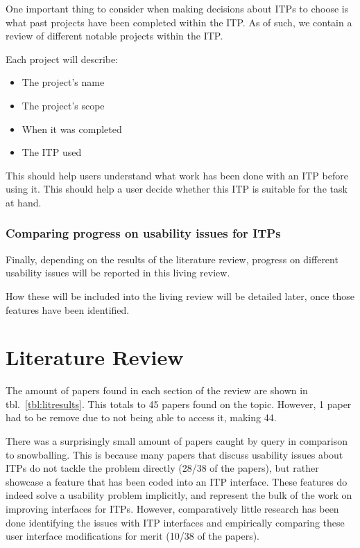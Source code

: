 \documentclass[
]{article}
\providecommand{\tightlist}{%
  \setlength{\itemsep}{0pt}\setlength{\parskip}{0pt}}
\begin{document}
One important thing to consider when making decisions about ITPs to
choose is what past projects have been completed within the ITP. As of
such, we contain a review of different notable projects within the ITP.

Each project will describe:

\begin{itemize}
\tightlist
\item
  The project's name
\item
  The project's scope
\item
  When it was completed
\item
  The ITP used
\end{itemize}

This should help users understand what work has been done with an ITP
before using it. This should help a user decide whether this ITP is
suitable for the task at hand.

\hypertarget{comparing-progress-on-usability-issues-for-itps}{%
\subsubsection{Comparing progress on usability issues for
ITPs}\label{comparing-progress-on-usability-issues-for-itps}}

Finally, depending on the results of the literature review, progress on
different usability issues will be reported in this living review.

How these will be included into the living review will be detailed
later, once those features have been identified.

\hypertarget{literature-review}{%
\section{Literature Review}\label{literature-review}}

The amount of papers found in each section of the review are shown in
tbl.~\ref{tbl:litresults}. This totals to 45 papers found on the topic.
However, 1 paper had to be remove due to not being able to access it,
making 44.

There was a surprisingly small amount of papers caught by query in
comparison to snowballing. This is because many papers that discuss
usability issues about ITPs do not tackle the problem directly (28/38 of
the papers), but rather showcase a feature that has been coded into an
ITP interface. These features do indeed solve a usability problem
implicitly, and represent the bulk of the work on improving interfaces
for ITPs. However, comparatively little research has been done
identifying the issues with ITP interfaces and empirically comparing
these user interface modifications for merit (10/38 of the papers).
\end{document}
